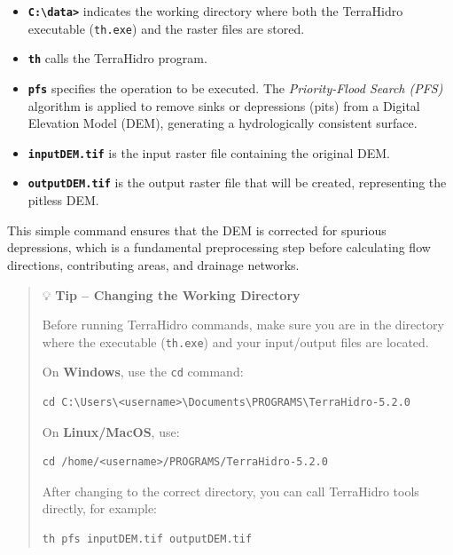 \documentclass[
]{book}
\providecommand{\tightlist}{%
  \setlength{\itemsep}{0pt}\setlength{\parskip}{0pt}}
\theoremstyle{definition}
\theoremstyle{definition}
\theoremstyle{definition}
\theoremstyle{definition}
\theoremstyle{remark}
\begin{document}
\begin{itemize}
\tightlist
\item
  \textbf{\texttt{C:\textbackslash{}data\textgreater{}}} indicates the working directory where both the TerraHidro executable (\texttt{th.exe}) and the raster files are stored.\\
\item
  \textbf{\texttt{th}} calls the TerraHidro program.\\
\item
  \textbf{\texttt{pfs}} specifies the operation to be executed. The \emph{Priority-Flood Search (PFS)} algorithm is applied to remove sinks or depressions (pits) from a Digital Elevation Model (DEM), generating a hydrologically consistent surface.\\
\item
  \textbf{\texttt{inputDEM.tif}} is the input raster file containing the original DEM.\\
\item
  \textbf{\texttt{outputDEM.tif}} is the output raster file that will be created, representing the pitless DEM.
\end{itemize}

This simple command ensures that the DEM is corrected for spurious depressions, which is a fundamental preprocessing step before calculating flow directions, contributing areas, and drainage networks.

\begin{quote}
💡 \textbf{Tip -- Changing the Working Directory}

Before running TerraHidro commands, make sure you are in the directory where the executable (\texttt{th.exe}) and your input/output files are located.

On \textbf{Windows}, use the \texttt{cd} command:

\begin{verbatim}
cd C:\Users\<username>\Documents\PROGRAMS\TerraHidro-5.2.0
\end{verbatim}

On \textbf{Linux/MacOS}, use:

\begin{verbatim}
cd /home/<username>/PROGRAMS/TerraHidro-5.2.0
\end{verbatim}

After changing to the correct directory, you can call TerraHidro tools directly, for example:

\begin{verbatim}
th pfs inputDEM.tif outputDEM.tif
\end{verbatim}
\end{quote}
\end{document}
